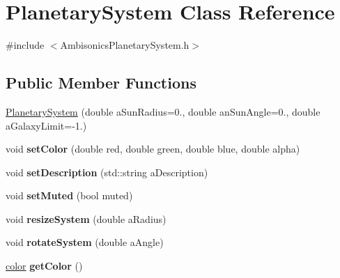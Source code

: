 \hypertarget{class_planetary_system}{\section{Planetary\-System Class Reference}
\label{class_planetary_system}
}


{\ttfamily \#include $<$Ambisonics\-Planetary\-System.\-h$>$}

\subsection*{Public Member Functions}
\begin{DoxyCompactItemize}
\item 
\hyperlink{class_planetary_system_a75364e14ed8680b68939ed5049cbb140}{Planetary\-System} (double a\-Sun\-Radius=0., double an\-Sun\-Angle=0., double a\-Galaxy\-Limit=-\/1.)
\item 
\hypertarget{class_planetary_system_a2da418a9083dfbde6ab46b0fda70599f}{void {\bfseries set\-Color} (double red, double green, double blue, double alpha)}\label{class_planetary_system_a2da418a9083dfbde6ab46b0fda70599f}

\item 
\hypertarget{class_planetary_system_afdb28ee5dda7c43290999f05bdfe61e5}{void {\bfseries set\-Description} (std\-::string a\-Description)}\label{class_planetary_system_afdb28ee5dda7c43290999f05bdfe61e5}

\item 
\hypertarget{class_planetary_system_accd206d4fd3b5b281dd4786a12a9c352}{void {\bfseries set\-Muted} (bool muted)}\label{class_planetary_system_accd206d4fd3b5b281dd4786a12a9c352}

\item 
\hypertarget{class_planetary_system_a5889c18bb920a88c2005f5ddf8552f73}{void {\bfseries resize\-System} (double a\-Radius)}\label{class_planetary_system_a5889c18bb920a88c2005f5ddf8552f73}

\item 
\hypertarget{class_planetary_system_a213e7e64d1ad3cb8c0a189914e6dd9aa}{void {\bfseries rotate\-System} (double a\-Angle)}\label{class_planetary_system_a213e7e64d1ad3cb8c0a189914e6dd9aa}

\item 
\hypertarget{class_planetary_system_adf88cbf1d1ef6890027568ca3a2f17a3}{\hyperlink{structcolor}{color} {\bfseries get\-Color} ()}\label{class_planetary_system_adf88cbf1d1ef6890027568ca3a2f17a3}


\end{DoxyCompactItemize}

